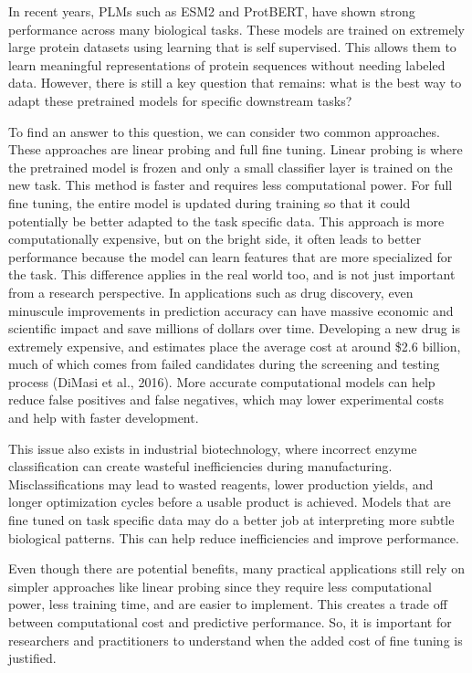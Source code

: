 \documentclass{article}
\begin{document}
In recent years, PLMs such as ESM2 and ProtBERT, have shown strong performance across many biological tasks. These models are trained on extremely large protein datasets using learning that is self supervised. This allows them to learn meaningful representations of protein sequences without needing labeled data. However, there is still a key question that remains: what is the best way to adapt these pretrained models for specific downstream tasks?

To find an answer to this question, we can consider two common approaches. These approaches are linear probing and full fine tuning. Linear probing is where the pretrained model is frozen and only a small classifier layer is trained on the new task. This method is faster and requires less computational power. For full fine tuning, the entire model is updated during training so that it could potentially be better adapted to the task specific data. This approach is more computationally expensive, but on the bright side, it often leads to better performance because the model can learn features that are more specialized for the task.
This difference applies in the real world too, and is not just important from a research perspective. In applications such as drug discovery, even minuscule improvements in prediction accuracy can have massive economic and scientific impact and save millions of dollars over time. Developing a new drug is extremely expensive, and estimates place the average cost at around \$2.6 billion, much of which comes from failed candidates during the screening and testing process (DiMasi et al., 2016). More accurate computational models can help reduce false positives and false negatives, which may lower experimental costs and help with faster development.

This issue also exists in industrial biotechnology, where incorrect enzyme classification can create wasteful inefficiencies during manufacturing. Misclassifications may lead to wasted reagents, lower production yields, and longer optimization cycles before a usable product is achieved. Models that are fine tuned on task specific data may do a better job at interpreting more subtle biological patterns. This can help reduce inefficiencies and improve performance. 

Even though there are potential benefits, many practical applications still rely on simpler approaches like linear probing since they require less computational power, less training time, and are easier to implement. This creates a trade off between computational cost and predictive performance. So, it is important for researchers and practitioners to understand when the added cost of fine tuning is justified.
\end{document}
